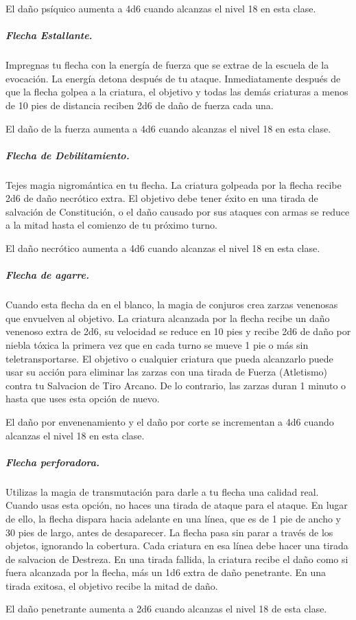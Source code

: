 \documentclass[a4paper,twocolumn,openany,10pt]{dndbook}
\begin{document}
El daño psíquico aumenta a 4d6 cuando alcanzas el nivel 18 en esta clase.

\subparagraph{Flecha Estallante.} Impregnas tu flecha con la energía de fuerza que se extrae de la escuela de la evocación. La
energía detona después de tu ataque. Inmediatamente después de que la flecha golpea a la criatura, el objetivo y todas las
demás criaturas a menos de 10 pies de distancia reciben 2d6 de daño de fuerza cada una.

El daño de la fuerza aumenta a 4d6 cuando alcanzas el nivel 18 en esta clase.

\subparagraph{Flecha de Debilitamiento.} Tejes magia nigromántica en tu flecha. La criatura golpeada por la flecha recibe 2d6
de daño necrótico extra. El objetivo debe tener éxito en una tirada de salvación de Constitución, o el daño causado por sus
ataques con armas se reduce a la mitad hasta el comienzo de tu próximo turno.

El daño necrótico aumenta a 4d6 cuando alcanzas el nivel 18 en esta clase.

\subparagraph{Flecha de agarre.} Cuando esta flecha da en el blanco, la magia de conjuros crea zarzas venenosas que envuelven
al objetivo. La criatura alcanzada por la flecha recibe un daño venenoso extra de 2d6, su velocidad se reduce en 10 pies y
recibe 2d6 de daño por niebla tóxica la primera vez que en cada turno se mueve 1 pie o más sin teletransportarse. El objetivo o
cualquier criatura que pueda alcanzarlo puede usar su acción para eliminar las zarzas con una tirada de Fuerza (Atletismo)
contra tu Salvacion de Tiro Arcano. De lo contrario, las zarzas duran 1 minuto o hasta que uses esta opción de nuevo.

El daño por envenenamiento y el daño por corte se incrementan a 4d6 cuando alcanzas el nivel 18 en esta clase.

\subparagraph{Flecha perforadora.} Utilizas la magia de transmutación para darle a tu flecha una calidad real. Cuando usas esta
opción, no haces una tirada de ataque para el ataque. En lugar de ello, la flecha dispara hacia adelante en una línea, que es
de 1 pie de ancho y 30 pies de largo, antes de desaparecer. La flecha pasa sin parar a través de los objetos, ignorando la
cobertura. Cada criatura en esa línea debe hacer una tirada de salvacion de Destreza. En una tirada fallida, la criatura
recibe el daño como si fuera alcanzada por la flecha, más un 1d6 extra de daño penetrante. En una tirada exitosa, el objetivo
recibe la mitad de daño.

El daño penetrante aumenta a 2d6 cuando alcanzas el nivel 18 de esta clase. 
\end{document}
